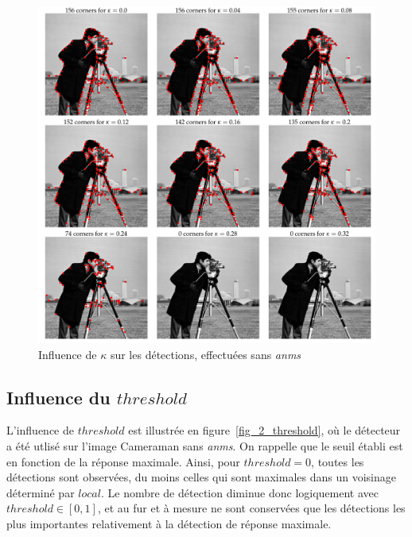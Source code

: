 \documentclass[12pt,a4paper,onecolumn]{article}
\begin{document}
\begin{figure}[H]
	\centering
	\includegraphics[width = 1.0\textwidth]{2_cameraman_kappa}
	\caption{Influence de \(\kappa\) sur les détections, effectuées sans \textit{anms}}
	\label{fig_2_kappa}
\end{figure}

\subsection{Influence du \(threshold\)}

L'influence de \(threshold\) est illustrée en figure~\ref{fig_2_threshold}, où le détecteur a été utlisé sur l'image Cameraman sans \textit{anms}. On rappelle que le seuil établi est en fonction de la réponse maximale. Ainsi, pour \(threshold = 0\), toutes les détections sont observées, du moins celles qui sont maximales dans un voisinage déterminé par \(local\). Le nombre de détection diminue donc logiquement avec \(threshold \in [0, 1]\), et au fur et à mesure ne sont conservées que les détections les plus importantes relativement à la détection de réponse maximale.
\end{document}
